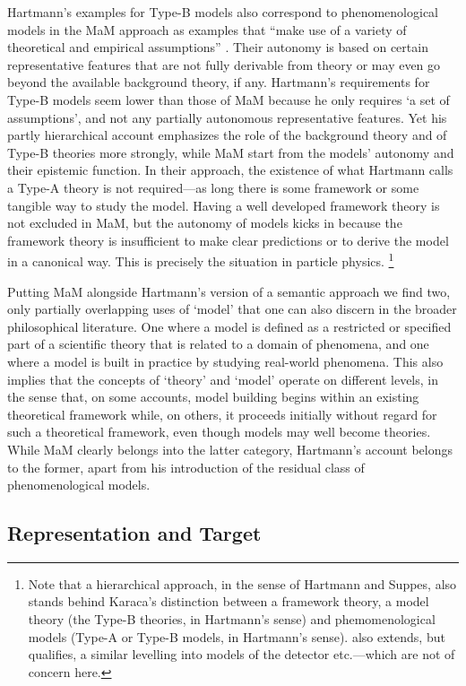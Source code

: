 Hartmann's examples for Type-B models also correspond to phenomenological models in the MaM approach as examples that ``make use of a variety of theoretical and empirical assumptions'' \citep[][p.~45]{morrison99}.
Their autonomy is based on certain representative features that are not fully derivable from theory or may even go beyond the available background theory, if any.  
Hartmann's requirements for Type-B models seem lower than those of MaM because he only requires `a set of assumptions', and not any partially autonomous representative features. 
Yet his partly hierarchical account emphasizes the role of the background theory and of Type-B theories more strongly, while MaM start from the models' autonomy and their epistemic function. 
In their approach, the existence of what Hartmann calls a Type-A theory is not required---as long there is some framework or some tangible way to study the model. 
Having a well developed framework theory is not excluded in MaM, but the autonomy of models kicks in because the framework theory is insufficient to make clear predictions or to derive the model in a canonical way. This is precisely the situation in particle physics.
\footnote{Note that a hierarchical approach, in the sense of Hartmann and Suppes, also stands behind Karaca's \citeyear{karaca2013} distinction between a framework theory, a model theory (the Type-B theories, in Hartmann's sense) and phemomenological models (Type-A or Type-B models, in Hartmann's sense).  \citet{karaca2018} also extends, but qualifies, a similar levelling into models of the detector etc.---which are not of concern here.}

Putting MaM alongside Hartmann's version of a semantic approach we find two, only partially overlapping uses of `model' that one can also discern in the broader philosophical literature. 
One where a model is defined as a restricted or specified part of a scientific theory that is related to a domain of phenomena, and one where a model is built in practice by studying real-world phenomena.
This also implies that the concepts of `theory' and `model' operate on different levels, in the sense that, on some accounts, model building begins within an existing theoretical framework while, on others, it proceeds initially without regard for such a theoretical framework, even though models may well become theories. While MaM clearly belongs into the latter category, Hartmann's account belongs to the former, apart from his introduction of the residual class of phenomenological models. 


\subsection{Representation and Target} \label{sub:reptarget}

